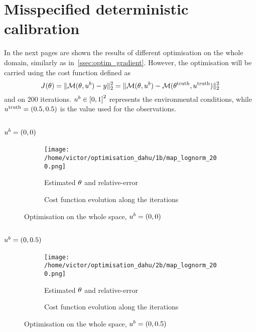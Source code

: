 \documentclass[../../Main_ManuscritThese.tex]{subfiles}
\begin{document}
\section{Misspecified deterministic calibration}
In the next pages are shown the results of different optimisation on
the whole domain, similarly as
in~\cref{ssec:optim_gradient}. However, the optimisation will be
carried using the cost function defined as
\begin{equation}
  J(\theta) = \|\mathcal{M}(\theta, u^b) - y \|^2_2 = \|\mathcal{M}(\theta, u^b) - \mathcal{M}(\theta^{\mathrm{truth}},u^{\mathrm{truth}})\|_2^2
\end{equation}
and on \num{200} iterations. $\uu^b\in \interval{0}{1}^2$ represents
the environmental conditions, while $u^{\mathrm{truth}}=(0.5, 0.5)$ is the value used for the observations.%

\clearpage
\subsection*{$u^b=(0, 0)$}
\begin{figure}[ht]
  \begin{subfigure}{\textwidth}
  \centering
  \texttt{[image: /home/victor/optimisation\_dahu/1b/map\_lognorm\_200.png]}
  \caption{Estimated $\theta$ and relative-error}
\end{subfigure}
\begin{subfigure}{\textwidth}
  \centering
  \resizebox{1\textwidth}{!}{}
  \caption{Cost function evolution along the iterations}
\end{subfigure}
\caption{Optimisation on the whole space, $u^b=(0, 0)$}
\end{figure}
\clearpage
\subsection*{$u^b=(0, 0.5)$}
\begin{figure}[ht]
  \begin{subfigure}{\textwidth}
  \centering
  \texttt{[image: /home/victor/optimisation\_dahu/2b/map\_lognorm\_200.png]}
  \caption{Estimated $\theta$ and relative-error}
\end{subfigure}
\begin{subfigure}{\textwidth}
  \centering
    \resizebox{1\textwidth}{!}{}
    \caption{Cost function evolution along the iterations}
  \end{subfigure}
  \caption{Optimisation on the whole space, $u^b=(0, 0.5)$}
\end{figure}
\clearpage
\end{document}
